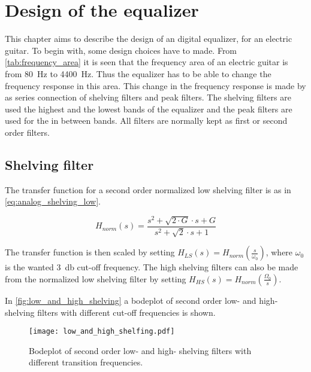 \section{Design of the equalizer}
This chapter aims to describe the design of an digital equalizer, for an electric guitar. 
To begin with, some design choices have to made. From \autoref{tab:frequency_area} it is seen that the frequency area of an electric guitar is from \SI{80}{\hertz} to \SI{4400}{\hertz}. Thus the equalizer has to be able to change the frequency response in this area. This change in the frequency response is made by as series connection of shelving filters and peak filters. The shelving filters are used the highest and the lowest bands of the equalizer and the peak filters are used for the in between bands. All filters are normally kept as first or second order filters. 

\subsection{Shelving filter}
The transfer function for a second order normalized low shelving filter is as in \autoref{eq:analog_shelving_low}.

\begin{equation}\label{eq:analog_shelving_low}
        H_{norm}(s) = \frac{s^2+\sqrt{2 \cdot G} \cdot s + G}{s^2+\sqrt{2} \cdot s +1}
    \end{equation}

    \startexplain
    \stopexplain

 The transfer function is then scaled by setting $H_{LS}(s)=H_{norm}(\frac{s}{\omega_0})$, where $\omega_0$ is the wanted \SI{3}{\decibel} cut-off frequency. The high shelving filters can also be made from the normalized low shelving filter by setting $H_{HS}(s) = H_{norm}(\frac{\Omega_0}{s})$.

    
In \autoref{fig:low_and_high_shelving} a bodeplot of second order low- and high- shelving filters with different cut-off frequencies is shown.

\begin{figure}
    \centering
        \texttt{[image: low\_and\_high\_shelfing.pdf]}
        \caption{Bodeplot of second order low- and high- shelving filters with different transition frequencies.}
        \label{fig:low_and_high_shelving}
  \end{figure} 

